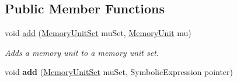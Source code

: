 \subsection*{Public Member Functions}
\begin{DoxyCompactItemize}
\item 
void \hyperlink{interfaceedu_1_1udel_1_1cis_1_1vsl_1_1civl_1_1state_1_1IF_1_1MemoryUnitFactory_a45c2d19cbc76ed74d1cb8531c96628a4}{add} (\hyperlink{interfaceedu_1_1udel_1_1cis_1_1vsl_1_1civl_1_1state_1_1IF_1_1MemoryUnitSet}{Memory\+Unit\+Set} mu\+Set, \hyperlink{interfaceedu_1_1udel_1_1cis_1_1vsl_1_1civl_1_1state_1_1IF_1_1MemoryUnit}{Memory\+Unit} mu)
\begin{DoxyCompactList}\small\item\em Adds a memory unit to a memory unit set. \end{DoxyCompactList}\item 
\hypertarget{interfaceedu_1_1udel_1_1cis_1_1vsl_1_1civl_1_1state_1_1IF_1_1MemoryUnitFactory_ae70de6e6685495042ee5b9d21e33050c}{}void {\bfseries add} (\hyperlink{interfaceedu_1_1udel_1_1cis_1_1vsl_1_1civl_1_1state_1_1IF_1_1MemoryUnitSet}{Memory\+Unit\+Set} mu\+Set, Symbolic\+Expression pointer)\label{interfaceedu_1_1udel_1_1cis_1_1vsl_1_1civl_1_1state_1_1IF_1_1MemoryUnitFactory_ae70de6e6685495042ee5b9d21e33050c}


\end{DoxyCompactItemize}
